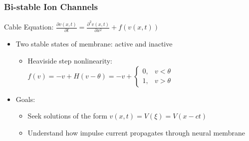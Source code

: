 \documentclass{beamer}
\begin{document}
\begin{frame}
\frametitle{Bi-stable Ion Channels}
Cable Equation: $\frac{\partial v(x,t)}{\partial t}=\frac{\partial ^2 v(x,t)}{\partial x^2}+f(v(x,t))$\\
\begin{itemize}
\item Two stable states of membrane: active and inactive
	\begin{itemize}
		\item Heaviside step nonlinearity: $f(v)=-v+H(v-\theta)=-v+
		\begin{cases}
    		0, & \text{$v<\theta$}\\
    		1, & \text{$v>\theta$}
  		\end{cases}$
	\end{itemize}
\item Goals: 
	\begin{itemize}
		\item Seek solutions of the form $v(x,t)=V(\xi)=V(x-ct)$
		\item Understand how impulse current propagates through neural membrane
	\end{itemize}
\end{itemize}
\end{frame}
\end{document}
